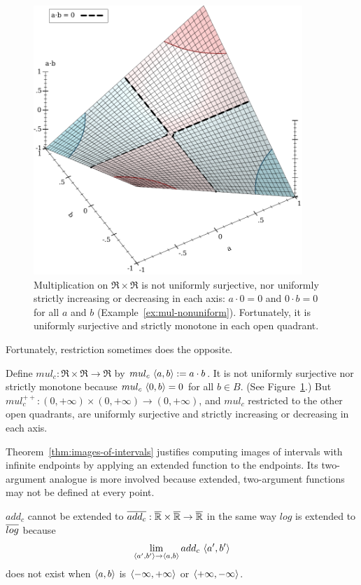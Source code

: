 \begin{figure}[!tb]
\centering
\includegraphics[width=4in]{mul-nonuniform-properties}
\caption[ ]{Multiplication on $\Re \times \Re$ is not uniformly surjective, nor uniformly strictly increasing or decreasing in each axis: $a \cdot 0 = 0$ and $0 \cdot b = 0$ for all $a$ and $b$ (Example~\ref{ex:mul-nonuniform}).
Fortunately, it is uniformly surjective and strictly monotone in each open quadrant.}
\label{fig:mul-nonuniform}
\end{figure}

Fortunately, restriction sometimes does the opposite.

\begin{example}
\label{ex:mul-nonuniform}
Define $mul_c : \Re \times \Re \to \Re$ by $mul_c~\langle{a,b}\rangle := a \cdot b$.
It is not uniformly surjective nor strictly monotone because $mul_c~\langle{0,b}\rangle = 0$ for all $b \in B$.
(See Figure~\ref{fig:mul-nonuniform}.)
But $mul_c^{++} : (0,+\infty) \times (0,+\infty) \to (0,+\infty)$, and $mul_c$ restricted to the other open quadrants, are uniformly surjective and strictly increasing or decreasing in each axis.
\exampleqed
\end{example}

Theorem~\ref{thm:images-of-intervals} justifies computing images of intervals with infinite endpoints by applying an extended function to the endpoints.
Its two-argument analogue is more involved because extended, two-argument functions may not be defined at every point.

\begin{example}
$add_c$ cannot be extended to $\cl{add_c} : \cl{\Re} \times \cl{\Re} \to \cl{\Re}$ in the same way $log$ is extended to $\cl{log}$ because
\begin{equation}
	\lim_{\langle{a',b'}\rangle \to \langle{a,b}\rangle} add_c~\langle{a',b'}\rangle
\end{equation}
does not exist when $\langle{a,b}\rangle$ is $\langle{-\infty,+\infty}\rangle$ or $\langle{+\infty,-\infty}\rangle$.
\exampleqed
\end{example}

